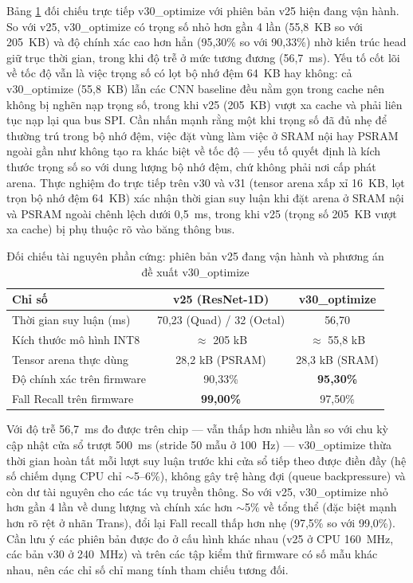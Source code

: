 \documentclass[../DoAn.tex]{subfiles}
\begin{document}
Bảng \ref{tab:mcu_perf} đối chiếu trực tiếp v30\_optimize với phiên bản v25 hiện đang vận hành. So với v25, v30\_optimize có trọng số nhỏ hơn gần 4 lần (55,8~KB so với 205~KB) và độ chính xác cao hơn hẳn (95,30\% so với 90,33\%) nhờ kiến trúc head giữ trục thời gian, trong khi độ trễ ở mức tương đương (56,7~ms). Yếu tố cốt lõi về tốc độ vẫn là việc trọng số có lọt bộ nhớ đệm 64~KB hay không: cả v30\_optimize (55,8~KB) lẫn các CNN baseline đều nằm gọn trong cache nên không bị nghẽn nạp trọng số, trong khi v25 (205~KB) vượt xa cache và phải liên tục nạp lại qua bus SPI. Cần nhấn mạnh rằng một khi trọng số đã đủ nhẹ để thường trú trong bộ nhớ đệm, việc đặt vùng làm việc ở SRAM nội hay PSRAM ngoài gần như không tạo ra khác biệt về tốc độ --- yếu tố quyết định là kích thước trọng số so với dung lượng bộ nhớ đệm, chứ không phải nơi cấp phát arena. Thực nghiệm đo trực tiếp trên v30 và v31 (tensor arena xấp xỉ 16~KB, lọt trọn bộ nhớ đệm 64~KB) xác nhận thời gian suy luận khi đặt arena ở SRAM nội và PSRAM ngoài chênh lệch dưới 0,5~ms, trong khi v25 (trọng số 205~KB vượt xa cache) bị phụ thuộc rõ vào băng thông bus.

\begin{table}[H]
\centering
\caption{Đối chiếu tài nguyên phần cứng: phiên bản v25 đang vận hành và phương án đề xuất v30\_optimize}
\label{tab:mcu_perf}
\small
\begin{tabular}{|l|c|c|}
\hline
\textbf{Chỉ số} & \textbf{v25 (ResNet-1D)} & \textbf{v30\_optimize} \\
\hline
Thời gian suy luận (ms)       & 70,23 (Quad) / 32 (Octal) & 56,70 \\
Kích thước mô hình INT8       & $\approx$ 205 kB & $\approx$ 55,8 kB \\
Tensor arena thực dùng        & 28,2 kB (PSRAM)  & 28,3 kB (SRAM) \\
Độ chính xác trên firmware    & 90,33\%          & \textbf{95,30\%} \\
Fall Recall trên firmware     & \textbf{99,00\%} & 97,50\% \\
\hline
\end{tabular}
\end{table}

Với độ trễ 56,7~ms đo được trên chip --- vẫn thấp hơn nhiều lần so với chu kỳ cập nhật cửa sổ trượt 500~ms (stride 50 mẫu ở 100~Hz) --- v30\_optimize thừa thời gian hoàn tất mỗi lượt suy luận trước khi cửa sổ tiếp theo được điền đầy (hệ số chiếm dụng CPU chỉ $\sim$5--6\%), không gây trệ hàng đợi (queue backpressure) và còn dư tài nguyên cho các tác vụ truyền thông. So với v25, v30\_optimize nhỏ hơn gần 4 lần về dung lượng và chính xác hơn $\sim$5\% về tổng thể (đặc biệt mạnh hơn rõ rệt ở nhãn Trans), đổi lại Fall recall thấp hơn nhẹ (97,5\% so với 99,0\%). Cần lưu ý các phiên bản được đo ở cấu hình khác nhau (v25 ở CPU 160~MHz, các bản v30 ở 240~MHz) và trên các tập kiểm thử firmware có số mẫu khác nhau, nên các chỉ số chỉ mang tính tham chiếu tương đối.
\end{document}

